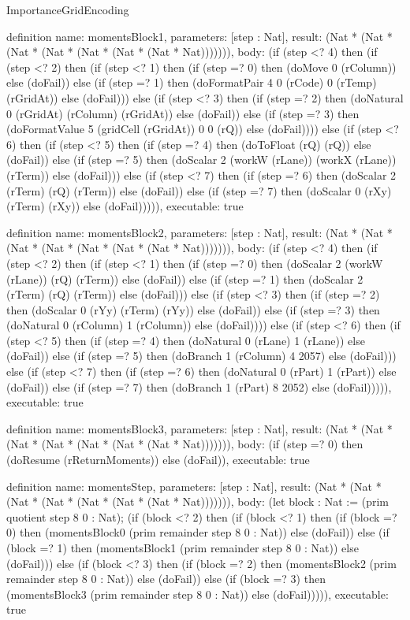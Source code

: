 \begin{lexlean}{ImportanceGridEncoding}
\begin{semanticmodule}
definition{
  name: momentsBlock1,
  parameters: [step : Nat],
  result: (Nat * (Nat * (Nat * (Nat * (Nat * (Nat * (Nat * Nat))))))),
  body: (if (step <? 4) then
      (if (step <? 2) then
      (if (step <? 1) then
      (if (step =? 0) then (doMove 0 (rColumn)) else (doFail)) else
      (if (step =? 1) then (doFormatPair 4 0 (rCode) 0 (rTemp) (rGridAt)) else (doFail))) else
      (if (step <? 3) then
      (if (step =? 2) then (doNatural 0 (rGridAt) (rColumn) (rGridAt)) else (doFail)) else
      (if (step =? 3) then (doFormatValue 5 (gridCell (rGridAt)) 0 0 (rQ)) else (doFail)))) else
      (if (step <? 6) then
      (if (step <? 5) then
      (if (step =? 4) then (doToFloat (rQ) (rQ)) else (doFail)) else
      (if (step =? 5) then (doScalar 2 (workW (rLane)) (workX (rLane)) (rTerm)) else (doFail))) else
      (if (step <? 7) then
      (if (step =? 6) then (doScalar 2 (rTerm) (rQ) (rTerm)) else (doFail)) else
      (if (step =? 7) then (doScalar 0 (rXy) (rTerm) (rXy)) else (doFail))))),
  executable: true
}

definition{
  name: momentsBlock2,
  parameters: [step : Nat],
  result: (Nat * (Nat * (Nat * (Nat * (Nat * (Nat * (Nat * Nat))))))),
  body: (if (step <? 4) then
      (if (step <? 2) then
      (if (step <? 1) then
      (if (step =? 0) then (doScalar 2 (workW (rLane)) (rQ) (rTerm)) else (doFail)) else
      (if (step =? 1) then (doScalar 2 (rTerm) (rQ) (rTerm)) else (doFail))) else
      (if (step <? 3) then
      (if (step =? 2) then (doScalar 0 (rYy) (rTerm) (rYy)) else (doFail)) else
      (if (step =? 3) then (doNatural 0 (rColumn) 1 (rColumn)) else (doFail)))) else
      (if (step <? 6) then
      (if (step <? 5) then
      (if (step =? 4) then (doNatural 0 (rLane) 1 (rLane)) else (doFail)) else
      (if (step =? 5) then (doBranch 1 (rColumn) 4 2057) else (doFail))) else
      (if (step <? 7) then
      (if (step =? 6) then (doNatural 0 (rPart) 1 (rPart)) else (doFail)) else
      (if (step =? 7) then (doBranch 1 (rPart) 8 2052) else (doFail))))),
  executable: true
}

definition{
  name: momentsBlock3,
  parameters: [step : Nat],
  result: (Nat * (Nat * (Nat * (Nat * (Nat * (Nat * (Nat * Nat))))))),
  body: (if (step =? 0) then (doResume (rReturnMoments)) else (doFail)),
  executable: true
}

definition{
  name: momentsStep,
  parameters: [step : Nat],
  result: (Nat * (Nat * (Nat * (Nat * (Nat * (Nat * (Nat * Nat))))))),
  body: (let block : Nat := (prim quotient step 8 0 : Nat); (if (block <? 2) then
      (if (block <? 1) then
      (if (block =? 0) then (momentsBlock0 (prim remainder step 8 0 : Nat)) else (doFail)) else
      (if (block =? 1) then (momentsBlock1 (prim remainder step 8 0 : Nat)) else (doFail))) else
      (if (block <? 3) then
      (if (block =? 2) then (momentsBlock2 (prim remainder step 8 0 : Nat)) else (doFail)) else
      (if (block =? 3) then (momentsBlock3 (prim remainder step 8 0 : Nat)) else (doFail))))),
  executable: true
}


\end{semanticmodule}
\end{lexlean}
